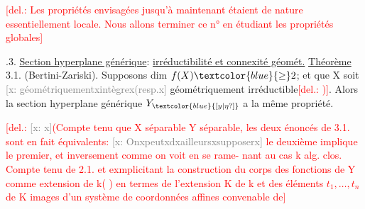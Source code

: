 \documentclass[11pt]{article}
\newcommand{\scanpage}[1]{\par\bigskip\noindent{\small\sffamily[scan #1]}\par}
\newcommand{\mspage}[1]{{\small\sffamily[p.\,#1]}}
\newcommand{\hand}[1]{\textcolor{blue}{#1}}
\let\over\relax
\newcommand{\over}[2]{\textcolor{gray}{#1}\textcolor{blue}{\ensuremath{^{\!\nearrow}}#2}}
\newcommand{\deleted}[1]{\textcolor{red}{[\textsf{del.:} #1]}}
\newcommand{\xout}[1]{\textcolor{gray}{[\textsf{x:} #1]}}
\newcommand{\uline}[1]{\underline{#1}}
\newcommand{\unsure}[1]{[#1?]}
\begin{document}
\deleted{Les propriétés envisagées jusqu'à maintenant étaient de nature
essentiellement locale. Nous allons terminer ce n° en étudiant les
propriétés globales}

\over{\unsure{3}}{2}.3.   \uline{Section hyperplane générique}: \uline{irréductibilité et connexité géomét.}
\uline{Théorème} 3.1. (Bertini-Zariski).  Supposons dim $f(X) \hand{\geq} 2$; et que X
soit \xout{géométriquementxintègrex(resp.x} géométriquement irréductible\deleted{)}. Alors
la section hyperplane générique $Y_{\hand{\unsure{y|\eta}}}$ a la même propriété.

\deleted{\xout{x}(Compte tenu que X séparable \hspace{3em} Y séparable, les deux énoncés
de 3.1. sont en fait équivalents: \xout{Onxpeutxdxailleursxsupposerx}  le
deuxième implique le premier, et inversement comme on voit en se rame-%
nant au cas k alg. clos.  Compte tenu de 2.1. et exmplicitant
la construction du corps des fonctions de Y \hspace{2em} comme extension de k( \hspace{1em} )
en termes de l'extension K de k et des éléments $t_1,\ldots,t_n$ de K images
d'un système de coordonnées affines convenable de}

\mspage{15}

\clearpage
\scanpage{25/16}
\mspage{13}
\end{document}
